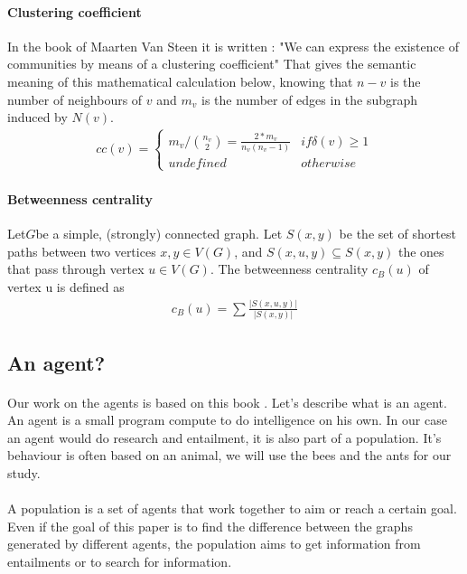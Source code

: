 \documentclass{article}
\begin{document}
		\paragraph{Clustering coefficient}
			In the book of Maarten Van Steen it is written :
			"We can express the existence of communities by means of a clustering coefficient"\cite{Steen10}
			That gives the semantic meaning of this mathematical calculation below,
			knowing that $n-v$ is the number of neighbours of $v$
			and $m_v$ is the number of edges in the subgraph induced by $N(v)$.
		\begin{align*}
			cc(v) = \begin{cases}
				m_v/ \binom{n_v}{2} = \frac{2*m_v}{n_v(n_v-1)} & if \delta(v) \ge 1 \\
				undefined & otherwise
			\end{cases}
		\end{align*}
		\paragraph{Betweenness centrality}
			Let$G$be a simple, (strongly) connected graph.
			Let $S(x,y)$ be the set of shortest paths between two vertices $x,y \in V(G)$,
			and $S(x,u,y) \subseteq S(x,y)$ the ones that pass through vertex $u \in V (G)$.
			The betweenness centrality $c_B (u)$ of vertex u is defined as
		\begin{align*}
			c_B (u) = \sum \frac{|S(x,u,y)|}{|S(x,y)|}
		\end{align*}
	\subsection{An agent?}
		\paragraph{}
			Our work on the agents is based on this book \cite{Engelbrecht05}.
			Let's describe what is an agent.
			An agent is a small program compute to do intelligence on his own.
			In our case an agent would do research and entailment,
			it is also part of a population.
			It's behaviour is often based on an animal, we will use the bees and the ants for our study.
		\paragraph{}
			A population is a set of agents that work together to aim or reach a certain goal.
			Even if the goal of this paper is to find the difference between the graphs generated by different agents,
			the population aims to get information from entailments or to search for information.			
\end{document}
